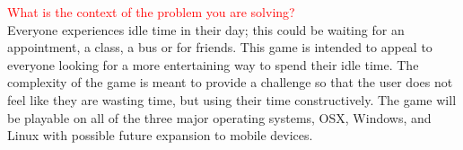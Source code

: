 \documentclass[12pt]{article}
\begin{document}
\textcolor{red}{What is the context of the problem you are solving?}\\
Everyone experiences idle time in their day; this could be waiting for an appointment, a class, a bus or for friends. This game is intended to appeal to everyone looking for a more entertaining way to spend their idle time. The complexity of the game is meant to provide a challenge so that the user does not feel like they are wasting time, but using their time constructively. 
The game will be playable on all of the three major operating systems, OSX, Windows, and Linux with possible future expansion to mobile devices. \vspace{10mm}
\end{document}
